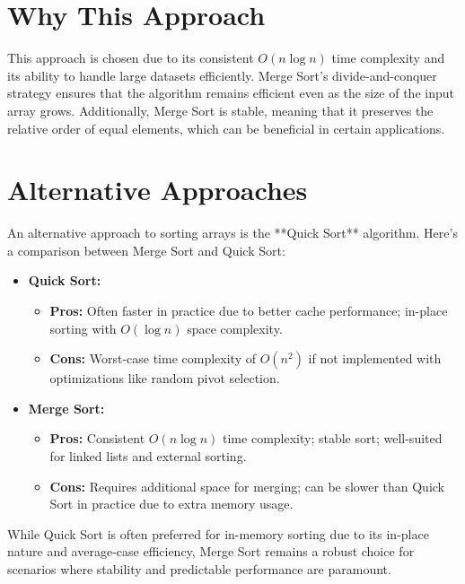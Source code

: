 \section*{Why This Approach}
This approach is chosen due to its consistent \(O(n \log n)\) time complexity and its ability to handle large datasets efficiently. Merge Sort's divide-and-conquer strategy ensures that the algorithm remains efficient even as the size of the input array grows. Additionally, Merge Sort is stable, meaning that it preserves the relative order of equal elements, which can be beneficial in certain applications.

\section*{Alternative Approaches}
An alternative approach to sorting arrays is the **Quick Sort** algorithm. Here's a comparison between Merge Sort and Quick Sort:

\begin{itemize}
    \item \textbf{Quick Sort:}
    \begin{itemize}
        \item \textbf{Pros:} Often faster in practice due to better cache performance; in-place sorting with \(O(\log n)\) space complexity.
        \item \textbf{Cons:} Worst-case time complexity of \(O(n^2)\) if not implemented with optimizations like random pivot selection.
    \end{itemize}
    
    \item \textbf{Merge Sort:}
    \begin{itemize}
        \item \textbf{Pros:} Consistent \(O(n \log n)\) time complexity; stable sort; well-suited for linked lists and external sorting.
        \item \textbf{Cons:} Requires additional space for merging; can be slower than Quick Sort in practice due to extra memory usage.
    \end{itemize}
\end{itemize}

While Quick Sort is often preferred for in-memory sorting due to its in-place nature and average-case efficiency, Merge Sort remains a robust choice for scenarios where stability and predictable performance are paramount.


